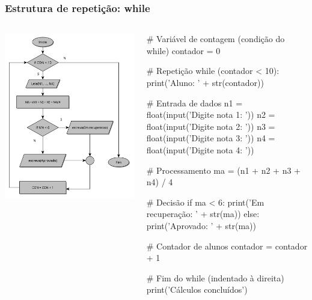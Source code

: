 \documentclass{beamer}
\begin{document}
\begin{frame}[fragile]
\frametitle{Estrutura de repetição: while}

\begin{columns}
    \begin{column}{0.5\textwidth}	
    \center \includegraphics[scale=0.3]{./figures/while-media.pdf}	
    \end{column}
    
\begin{column}{0.5\textwidth}  %
\begin{python}
# Variável de contagem (condição do while)
contador = 0

# Repetição
while (contador < 10):
    print('Aluno: ' + str(contador))
    
    # Entrada de dados
    n1 = float(input('Digite nota 1: '))
    n2 = float(input('Digite nota 2: '))
    n3 = float(input('Digite nota 3: '))
    n4 = float(input('Digite nota 4: '))

    # Processamento
    ma = (n1 + n2 + n3 + n4) / 4
    
    # Decisão
    if ma < 6:
        print('Em recuperação: ' + str(ma))
    else:
        print('Aprovado: ' + str(ma))
    
    # Contador de alunos
    contador = contador + 1

# Fim do while (indentado à direita)
print('Cálculos concluídos')
\end{python}  
\end{column}
\end{columns}
\end{frame}
\end{document}
